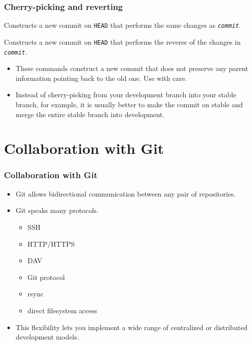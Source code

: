 \documentclass{beamer}
\begin{document}
\begin{frame}
  \frametitle{Cherry-picking and reverting}
  \begin{description}
  \item[\texttt{git cherry-pick \textit{commit}}\hfill] Constructs a
    new commit on \texttt{HEAD} that performs the same changes as
    \texttt{\textit{commit}}.
  \item[\texttt{git revert \textit{commit}}\hfill] Constructs a new
    commit on \texttt{HEAD} that performs the reverse of the changes
    in \texttt{\textit{commit}}.
  \end{description}

  \begin{itemize}
  \item These commands construct a new commit that does not preserve
    any parent information pointing back to the old one.  Use with
    care.
  \item Instead of cherry-picking from your development branch into
    your stable branch, for example, it is usually better to make the
    commit on stable and merge the entire stable branch into
    development.
  \end{itemize}
\end{frame}

\section{Collaboration with Git}

\begin{frame}
  \frametitle{Collaboration with Git}
  \begin{itemize}
  \item Git allows bidirectional communication between any pair of
    repositories.
  \item Git speaks many protocols.
    \begin{itemize}
    \item SSH
    \item HTTP/HTTPS
    \item DAV
    \item Git protocol
    \item rsync
    \item direct filesystem access
    \end{itemize}
  \item This flexibility lets you implement a wide range of
    centralized or distributed development models.
  \end{itemize}
\end{frame}
\end{document}

